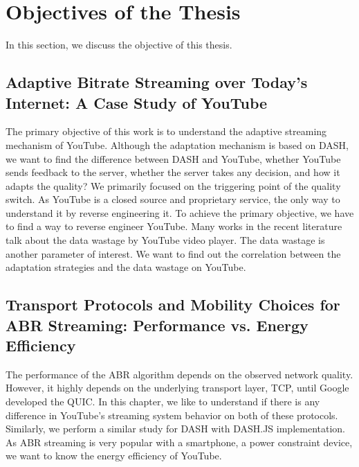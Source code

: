 \section{Objectives of the Thesis}
In this section, we discuss the objective of this thesis.

\subsection{Adaptive Bitrate Streaming over Today's Internet: A Case Study of YouTube}
The primary objective of this work is to understand the adaptive streaming mechanism of YouTube. Although the adaptation mechanism is based on DASH, we want to find the difference between DASH and YouTube, whether YouTube sends feedback to the server, whether the server takes any decision, and how it adapts the quality? We primarily focused on the triggering point of the quality switch. As YouTube is a closed source and proprietary service, the only way to understand it by reverse engineering it. To achieve the primary objective, we have to find a way to reverse engineer YouTube. Many works in the recent literature talk about the data wastage by YouTube video player. The data wastage is another parameter of interest. We want to find out the correlation between the adaptation strategies and the data wastage on YouTube.

\subsection{Transport Protocols and Mobility Choices for ABR Streaming: Performance vs. Energy Efficiency}
The performance of the ABR algorithm depends on the observed network quality. However, it highly depends on the underlying transport layer, TCP, until Google developed the QUIC. In this chapter, we like to understand if there is any difference in YouTube's streaming system behavior on both of these protocols. Similarly, we perform a similar study for DASH with DASH.JS implementation. As ABR streaming is very popular with a smartphone, a power constraint device, we want to know the energy efficiency of YouTube. 

